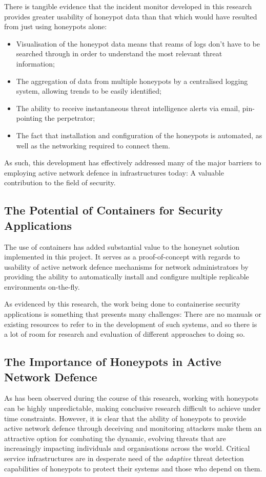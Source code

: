 There is tangible evidence that the incident monitor developed in this research provides greater usability of honeypot data than that which would have resulted from just using honeypots alone:

\begin{itemize}

\item Visualisation of the honeypot data means that reams of logs don't have to be searched through in order to understand the most relevant threat information;
\item The aggregation of data from multiple honeypots by a centralised logging system, allowing trends to be easily identified;
\item The ability to receive instantaneous threat intelligence alerts via email, pin-pointing the perpetrator;
\item The fact that installation and configuration of the honeypots is automated, as well as the networking required to connect them.
\end{itemize}

As such, this development has effectively addressed many of the major barriers to employing active network defence in infrastructures today: A valuable contribution to the field of security.

\subsection{The Potential of Containers for Security Applications}
The use of containers has added substantial value to the honeynet solution implemented in this project. It serves as a proof-of-concept with regards to usability of active network defence mechanisms for network administrators by providing the ability to automatically install and configure multiple replicable environments on-the-fly.

As evidenced by this research, the work being done to containerise security applications is something that presents many challenges: There are no manuals or existing resources to refer to in the development of such systems, and so there is a lot of room for research and evaluation of different approaches to doing so.

\subsection{The Importance of Honeypots in Active Network Defence}
As has been observed during the course of this research, working with honeypots can be highly unpredictable, making conclusive research difficult to achieve under time constraints. However, it is clear that the ability of honeypots to provide active network defence through deceiving and monitoring attackers make them an attractive option for combating the dynamic, evolving threats that are increasingly impacting individuals and organisations across the world. Critical service infrastructures are in desperate need of the \textit{adaptive} threat detection capabilities of honeypots to protect their systems and those who depend on them.

